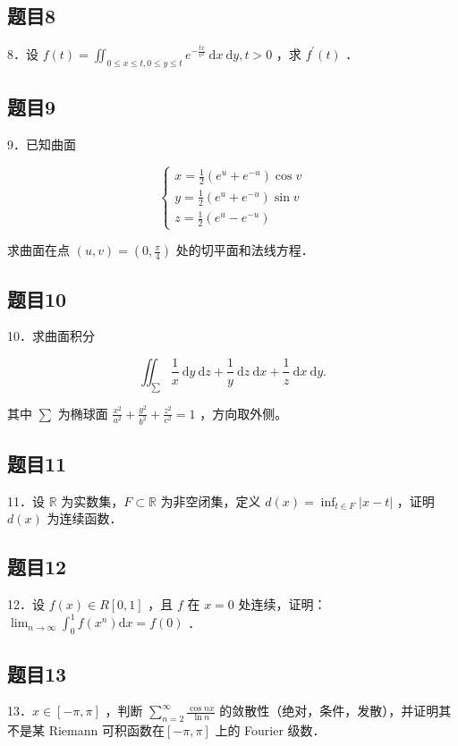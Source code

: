 \documentclass{article}
\begin{document}
\subsection{题目8}
8．设 \(f(t)=\iint_{0 \leq x \leq t, 0 \leq y \leq t} e^{-\frac{t x}{v^{2}}} \mathrm{~d} x \mathrm{~d} y, t>0\) ，求 \(f^{\prime}(t)\) ．

\subsection{题目9}
9．已知曲面

\[
\left\{\begin{array}{l}
x=\frac{1}{2}\left(e^{u}+e^{-u}\right) \cos v \\
y=\frac{1}{2}\left(e^{u}+e^{-u}\right) \sin v \\
z=\frac{1}{2}\left(e^{u}-e^{-u}\right)
\end{array}\right.
\]

求曲面在点 \((u, v)=\left(0, \frac{\pi}{4}\right)\) 处的切平面和法线方程．

\subsection{题目10}
10．求曲面积分

\[
\iint_{\sum} \frac{1}{x} \mathrm{~d} y \mathrm{~d} z+\frac{1}{y} \mathrm{~d} z \mathrm{~d} x+\frac{1}{z} \mathrm{~d} x \mathrm{~d} y .
\]

其中 \(\sum\) 为椭球面 \(\frac{x^{2}}{a^{2}}+\frac{y^{2}}{b^{2}}+\frac{z^{2}}{c^{2}}=1\) ，方向取外侧。

\subsection{题目11}
11．设 \(\mathbb{R}\) 为实数集，\(F \subset \mathbb{R}\) 为非空闭集，定义 \(d(x)=\inf _{t \in F}|x-t|\) ，证明 \(d(x)\) 为连续函数．

\subsection{题目12}
12．设 \(f(x) \in R[0,1]\) ，且 \(f\) 在 \(x=0\) 处连续，证明： \(\lim _{n \rightarrow \infty} \int_{0}^{1} f\left(x^{n}\right) \mathrm{d} x=f(0)\) ．

\subsection{题目13}
13．\(x \in[-\pi, \pi]\) ，判断 \(\sum_{n=2}^{\infty} \frac{\cos n x}{\ln n}\) 的敛散性（绝对，条件，发散），并证明其不是某 Riemann 可积函数在\([-\pi, \pi]\) 上的 Fourier 级数．
\end{document}
